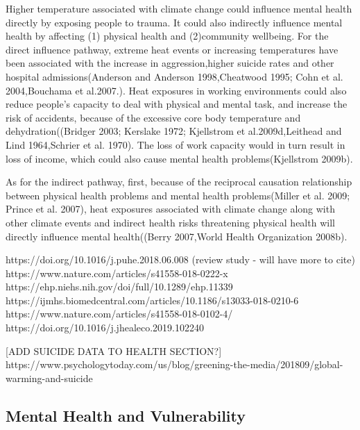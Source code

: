 \documentclass{article}
\begin{document}
Higher temperature associated with climate change could influence mental health directly by exposing people to trauma. It could also indirectly influence mental health by affecting (1) physical health and (2)community wellbeing\citep{RN1314}. For the direct influence pathway, extreme heat events or increasing temperatures have been associated with the increase in aggression,higher suicide rates and other hospital admissions(Anderson and Anderson 1998,Cheatwood 1995; Cohn et al. 2004,Bouchama et al.2007.). Heat exposures in working environments could also reduce people's capacity to deal with physical and mental task, and increase the risk of accidents, because of the excessive core body temperature and dehydration((Bridger 2003; Kerslake 1972; Kjellstrom et al.2009d,Leithead and Lind 1964,Schrier et al. 1970). The loss of work capacity would in turn result in loss of income, which could also cause mental health problems(Kjellstrom 2009b).

As for the indirect pathway, first, because of the reciprocal causation relationship between physical health problems and mental health problems(Miller et al. 2009; Prince et al. 2007), heat exposures associated with climate change along with other climate events and indirect health risks threatening physical health will directly influence mental health((Berry 2007,World Health Organization 2008b). 




https://doi.org/10.1016/j.puhe.2018.06.008 (review study - will have more to cite)
https://www.nature.com/articles/s41558-018-0222-x
https://ehp.niehs.nih.gov/doi/full/10.1289/ehp.11339
https://ijmhs.biomedcentral.com/articles/10.1186/s13033-018-0210-6
https://www.nature.com/articles/s41558-018-0102-4/
https://doi.org/10.1016/j.jhealeco.2019.102240

[ADD SUICIDE DATA TO HEALTH SECTION?]
https://www.psychologytoday.com/us/blog/greening-the-media/201809/global-warming-and-suicide

\subsection{Mental Health and Vulnerability}

\end{document}
